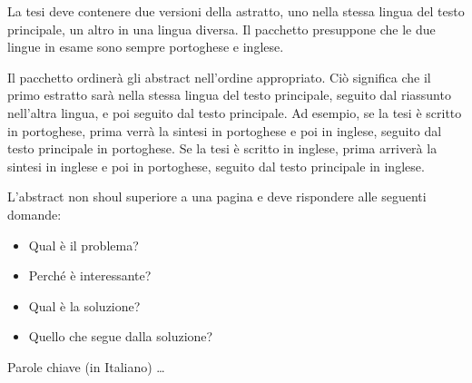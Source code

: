 

La tesi deve contenere due versioni della astratto, uno nella stessa lingua del testo principale, un altro in una lingua diversa. Il pacchetto presuppone che le due lingue in esame sono sempre portoghese e inglese.

Il pacchetto ordinerà gli abstract nell'ordine appropriato. Ciò significa che il primo estratto sarà nella stessa lingua del testo principale, seguito dal riassunto nell'altra lingua, e poi seguito dal testo principale. Ad esempio, se la tesi è scritto in portoghese, prima verrà la sintesi in portoghese e poi in inglese, seguito dal testo principale in portoghese. Se la tesi è scritto in inglese, prima arriverà la sintesi in inglese e poi in portoghese, seguito dal testo principale in inglese.

L'abstract non shoul superiore a una pagina e deve rispondere alle seguenti domande:

\begin{itemize}
\item Qual è il problema?
\item Perché è interessante?
\item Qual è la soluzione?
\item Quello che segue dalla soluzione?
\end{itemize}

\begin{keywords}
Parole chiave (in Italiano) \ldots
\end{keywords} 
